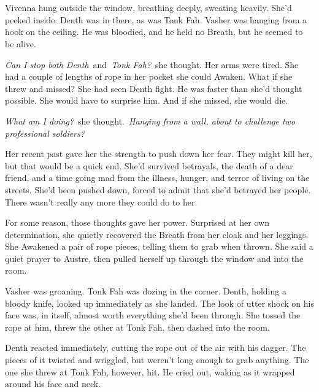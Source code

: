 \chapter{}

Vivenna hung outside the window, breathing deeply, sweating heavily. She’d peeked inside. Denth was in there, as was Tonk Fah. Vasher was hanging from a hook on the ceiling. He was bloodied, and he held no Breath, but he seemed to be alive.

\textit{Can I stop both Denth}~and~\textit{Tonk Fah?}~she thought. Her arms were tired. She had a couple of lengths of rope in her pocket she could Awaken. What if she threw and missed? She had seen Denth fight. He was faster than she’d thought possible. She would have to surprise him. And if she missed, she would die.

\textit{What am I doing?}~she thought.~\textit{Hanging from a wall, about to challenge two professional soldiers?}

Her recent past gave her the strength to push down her fear. They might kill her, but that would be a quick end. She’d survived betrayals, the death of a dear friend, and a time going mad from the illness, hunger, and terror of living on the streets. She’d been pushed down, forced to admit that she’d betrayed her people. There wasn’t really any more they could do to her.

For some reason, those thoughts gave her power. Surprised at her own determination, she quietly recovered the Breath from her cloak and her leggings. She Awakened a pair of rope pieces, telling them to grab when thrown. She said a quiet prayer to Austre, then pulled herself up through the window and into the room.

Vasher was groaning. Tonk Fah was dozing in the corner. Denth, holding a bloody knife, looked up immediately as she landed. The look of utter shock on his face was, in itself, almost worth everything she’d been through. She tossed the rope at him, threw the other at Tonk Fah, then dashed into the room.

Denth reacted immediately, cutting the rope out of the air with his dagger. The pieces of it twisted and wriggled, but weren’t long enough to grab anything. The one she threw at Tonk Fah, however, hit. He cried out, waking as it wrapped around his face and neck.

